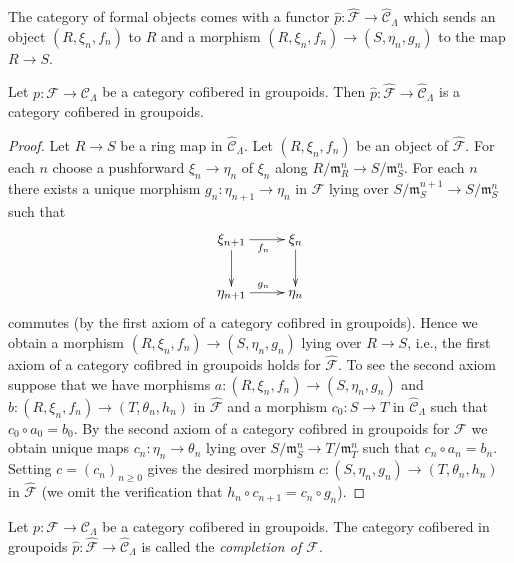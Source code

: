 \noindent
The category of formal objects comes with a functor $\widehat{p}: 
\widehat{\mathcal{F}} \to \widehat{\mathcal{C}}_\Lambda$ which sends an 
object $(R, \xi_n, f_n)$ to $R$ and a morphism
$(R, \xi_n, f_n) \to (S, \eta_n, g_n)$ to the map $R \to S$.

\begin{lemma}
\label{lemma-completion-cofibred}
Let $p : \mathcal{F} \to \mathcal{C}_\Lambda$ be a category cofibered in 
groupoids. Then
$\widehat{p} : \widehat{\mathcal{F}} \to \widehat{\mathcal{C}}_\Lambda$
is a category cofibered in groupoids.
\end{lemma}

\begin{proof}
Let $R \to S$ be a ring map in $\widehat{\mathcal{C}}_\Lambda$.
Let $(R, \xi_n, f_n)$ be an object of $\widehat{\mathcal{F}}$.
For each $n$ choose a pushforward $\xi_n \to \eta_n$ of $\xi_n$
along $R/\mathfrak m_R^n \to S/\mathfrak m_S^n$. For each $n$ there
exists a unique morphism $g_n : \eta_{n + 1} \to \eta_n$ in $\mathcal{F}$
lying over $S/\mathfrak m_S^{n + 1} \to S/\mathfrak m_S^n$ such that
$$
\xymatrix{
\xi_{n + 1} \ar[d] \ar[r]_{f_n} & \xi_n \ar[d] \\
\eta_{n + 1} \ar[r]^{g_n} & \eta_n
}
$$
commutes (by the first axiom of a category cofibred in groupoids).
Hence we obtain a morphism $(R, \xi_n, f_n) \to (S, \eta_n, g_n)$
lying over $R \to S$, i.e., the first axiom of a category cofibred in
groupoids holds for $\widehat{\mathcal{F}}$. To see the second axiom
suppose that we have morphisms
$a : (R, \xi_n, f_n) \to (S, \eta_n, g_n)$ and
$b : (R, \xi_n, f_n) \to (T, \theta_n, h_n)$ in $\widehat{\mathcal{F}}$
and a morphism $c_0 : S \to T$ in $\widehat{\mathcal{C}}_\Lambda$ such that
$c_0 \circ a_0 = b_0$. By the second axiom of a category cofibred in groupoids
for $\mathcal{F}$ we obtain unique maps $c_n : \eta_n \to \theta_n$
lying over $S/\mathfrak m_S^n \to T/\mathfrak m_T^n$ such that
$c_n \circ a_n = b_n$. Setting $c = (c_n)_{n \geq 0}$ gives the desired
morphism $c : (S, \eta_n, g_n) \to (T, \theta_n, h_n)$ in
$\widehat{\mathcal{F}}$ (we omit the verification that
$h_n \circ c_{n + 1} = c_n \circ g_n$).
\end{proof}

\begin{definition}
\label{definition-completion}
Let $p : \mathcal{F} \to \mathcal{C}_\Lambda$ be a category cofibered in 
groupoids. The category cofibered in groupoids
$\widehat{p} : \widehat{\mathcal  F} \to \widehat{\mathcal{C}}_\Lambda$
is called the {\it completion of $\mathcal{F}$}.
\end{definition}

